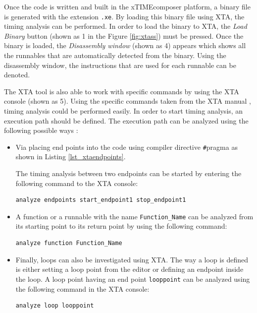 Once the code is written and built in the xTIMEcomposer platform, a binary file is generated with the extension \texttt{.xe}. By loading this binary file using XTA, the timing analysis can be performed. In order to load the binary to XTA, the \textit{Load Binary} button (shown as 1 in the Figure \ref{fig:xtass}) must be pressed. Once the binary is loaded, the \textit{Disassembly window} (shown as 4) appears which shows all the runnables that are automatically detected from the binary. Using the disassembly window, the instructions that are used for each runnable can be denoted.

The XTA tool is also able to work with specific commands by using the XTA console (shown as 5). Using the specific commands taken from the XTA manual \cite{xtamanual}, timing analysis could be performed easily. In order to start timing analysis, an execution path should be defined. The execution path can be analyzed using the following possible ways \cite{xtamanual}:

\begin{itemize}
	\item Via placing end points into the code using compiler directive \texttt{\#}pragma as shown in Listing \ref{lst_xtaendpoints}.
	
	The timing analysis between two endpoints can be started by entering the following command to the XTA console:
	\begin{lstlisting}[style=xc]
	analyze endpoints start_endpoint1 stop_endpoint1
	\end{lstlisting}
	\item A function or a runnable with the name \texttt{Function\texttt{\_}Name} can be analyzed from its starting point to its return point by using the following command:
	\begin{lstlisting}[style=xc]
	analyze function Function_Name
	\end{lstlisting}
	\item Finally, loops can also be investigated using XTA. The way a loop is defined is either setting a loop point from the editor or defining an endpoint inside the loop. A loop point having an end point \texttt{looppoint} can be analyzed using the following command in the XTA console: \\
	\begin{lstlisting}[style=xc]
		analyze loop looppoint
	\end{lstlisting}
\end{itemize}

